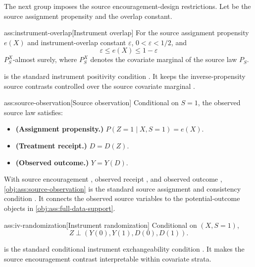 \documentclass[11pt]{article}
\begin{document}
The next group imposes the source encouragement-design restrictions. Let  be the source assignment propensity and  the overlap constant.

\begin{assumptionv}{ass:instrument-overlap}[Instrument overlap]
For the source assignment propensity \(e(X)\) and instrument-overlap constant \(\varepsilon\), \(0<\varepsilon<1/2\), and
\[
\varepsilon\le e(X)\le 1-\varepsilon
\]
\(P_S^X\)-almost surely, where \(P_S^X\) denotes the covariate marginal of the source law \(P_S\).
\end{assumptionv}

 is the standard instrument positivity condition \citep{ChenHuang2025}. It keeps the inverse-propensity source contrasts controlled over the source covariate marginal .

\begin{assumptionv}{ass:source-observation}[Source observation]
Conditional on \(S=1\), the observed source law satisfies:
\begin{itemize}
\item \textbf{(Assignment propensity.)} \(P(Z=1\mid X,S=1)=e(X)\).
\item \textbf{(Treatment receipt.)} \(D=D(Z)\).
\item \textbf{(Observed outcome.)} \(Y=Y(D)\).
\end{itemize}
\end{assumptionv}

With source encouragement , observed receipt , and observed outcome , \cref{obj:ass:source-observation} is the standard source assignment and consistency condition \citep{ChenHuang2025}. It connects the observed source variables to the potential-outcome objects in \cref{obj:ass:full-data-support}.

\begin{assumptionv}{ass:iv-randomization}[Instrument randomization]
Conditional on \((X,S=1)\),
\[
Z\perp (Y(0),Y(1),D(0),D(1)).
\]
\end{assumptionv}

 is the standard conditional instrument exchangeability condition \citep{ChenHuang2025}. It makes the source encouragement contrast interpretable within covariate strata.
\end{document}

